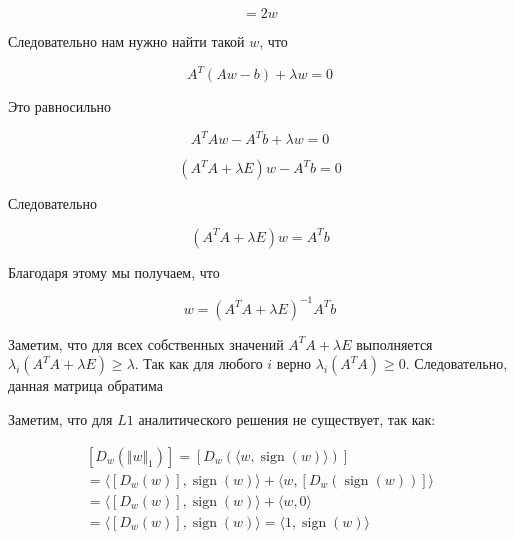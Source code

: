 \documentclass{article}
\begin{document}
    \begin{equation}
        [D_{w}(\langle w, w \rangle)] = 2 w
    \end{equation}

    Следовательно нам нужно найти такой $w$, что 

    \begin{equation}
        A^{T} (A w - b) + \lambda w = 0
    \end{equation}

    Это равносильно

    \begin{equation}
        A^{T} A w - A^{T} b + \lambda w = 0
    \end{equation}

    \begin{equation}
        (A^{T} A + \lambda E)w - A^{T} b = 0
    \end{equation}

    Следовательно

    \begin{equation}
        (A^{T} A + \lambda E)w = A^{T} b
    \end{equation}

    Благодаря этому мы получаем, что 

    \begin{equation}
        w = (A^{T} A + \lambda E)^{-1}  A^{T} b
    \end{equation}

    Заметим, что для всех собственных значений $A^{T} A + \lambda E$ выполняется $\lambda_{i}(A^{T} A + \lambda E) \geq \lambda$. 
    Так как для любого $i$ верно $\lambda_{i}(A^{T} A) \geq 0$. Следовательно, данная матрица обратима

    Заметим, что для $L1$ аналитического решения не существует, так как: 

    \[
    \begin{gathered}
        [D_{w}(\Vert w \Vert_{1})] = [D_{w}(\langle w, \operatorname{sign}(w) \rangle)] \\ 
        = \langle [D_{w}(w)], \operatorname{sign}(w) \rangle + \langle w, [D_{w}(\operatorname{sign}(w) )]\rangle \\ 
        = \langle [D_{w}(w)], \operatorname{sign}(w) \rangle + \langle w, 0 \rangle \\ 
        = \langle [D_{w}(w)], \operatorname{sign}(w) \rangle = \langle 1, \operatorname{sign}(w) \rangle
    \end{gathered}
    \]
\end{document}
